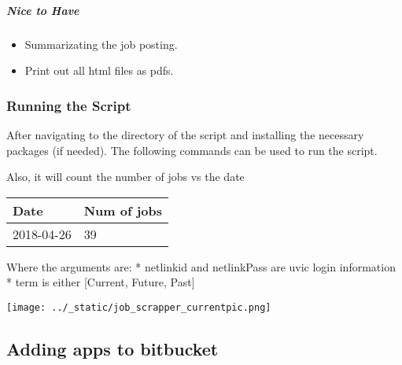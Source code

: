 \subparagraph{Nice to Have}\label{nice-to-have}

\begin{itemize}
\tightlist
\item
  Summarizating the job posting.
\item
  Print out all html files as pdfs.
\end{itemize}


\subsubsection{Running the Script}\label{running-the-script}

After navigating to the directory of the script and installing the
necessary packages (if needed). The following commands can be used to
run the script.

Also, it will count the number of jobs vs the date

\begin{longtable}[]{@{}ll@{}}
\toprule
\begin{minipage}[b]{0.20\columnwidth}\raggedright
Date\strut
\end{minipage} & \begin{minipage}[b]{0.21\columnwidth}\raggedright
Num of jobs\strut
\end{minipage}\tabularnewline
\midrule
\endhead
\begin{minipage}[t]{0.20\columnwidth}\raggedright
2018-04-26\strut
\end{minipage} & \begin{minipage}[t]{0.21\columnwidth}\raggedright
39\strut
\end{minipage}\tabularnewline
\bottomrule
\end{longtable}

\begin{Shaded}
\end{Shaded}

Where the arguments are: * netlinkid and netlinkPass are uvic login
information * term is either {[}Current, Future, Past{]}

\texttt{[image: ../\_static/job\_scrapper\_currentpic.png]}


\subsection{Adding apps to bitbucket}\label{adding-apps-to-bitbucket}

